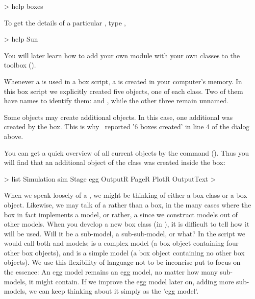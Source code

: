 \begin{usdialog}
> help boxes
\end{usdialog}

To get the details of a particular , type \eg,
\begin{usdialog}
> help Sun
\end{usdialog}

You will later learn how to add your own module with your own  classes to the toolbox ().

Whenever a   is used in a box script, a   is created in your computer's memory. In this box script we explicitly created five objects, one of each class. Two of them have names to identify them:  and , while the other three remain unnamed. 

Some  objects may create additional  objects. In this case, one additional  was created by the  box. This is why \US\ reported '6 boxes created' in line 4 of the dialog above.

You can get a quick overview of all current  objects by the  command (). Thus you will find that an additional  object of the  class was created inside the  box:

\lstset{numbers=left}
\begin{usdialog}
> list
Simulation sim
  Stage egg
  OutputR 
    PageR 
      PlotR 
    OutputText 
>
\end{usdialog}
\lstset{numbers=none}

When we speak loosely of a , we might be thinking of either  a box class or a box object. Likewise, we may talk of a  rather than a box, in the many cases where the box in fact implements a model, or rather, a  since we construct models out of other models. When you develop a new box class (in \CPP), it is difficult to tell how it will be used. Will it be a sub-model, a sub-sub-model, or what? In the  script we would call both  and  models;  is a complex model (a box object containing four other box objects), and  is a simple model (a box object containing no other box objects). We use this flexibility of language not to be inconcise put to focus on the essence: An egg model remains an egg model, no matter how many sub-models, it might contain. If we improve the egg model later on, adding more sub-models, we can keep thinking about it simply as the 'egg model'.

